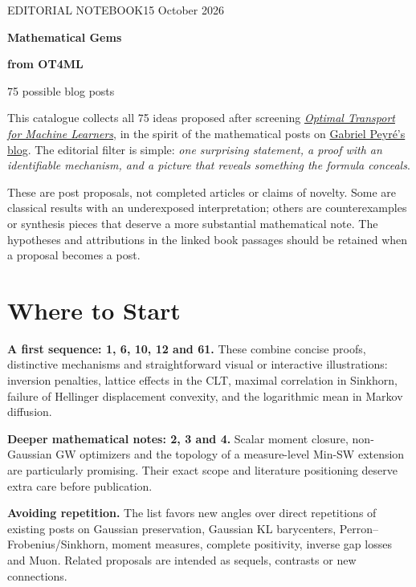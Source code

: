 \documentclass[11pt,a4paper]{article}
\newcounter{post}
\begin{document}
\thispagestyle{empty}
{\small\sffamily\color{accent}EDITORIAL NOTEBOOK\hfill 15 October 2026\par}
\vspace{13pt}
{\Huge\bfseries\color{ink}Mathematical Gems\par}
\vspace{3pt}
{\Huge\bfseries\color{ink}from OT4ML\par}
\vspace{9pt}
{\Large\color{muted}75 possible blog posts\par}
\vspace{15pt}

This catalogue collects all 75 ideas proposed after screening
\href{https://www.gpeyre.com/ot4ml/}{\emph{Optimal Transport for Machine Learners}},
in the spirit of the mathematical posts on
\href{https://www.gpeyre.com/blog/}{Gabriel Peyr\'e's blog}.
The editorial filter is simple: \emph{one surprising statement, a proof with an
identifiable mechanism, and a picture that reveals something the formula conceals}.

These are post proposals, not completed articles or claims of novelty.
Some are classical results with an underexposed interpretation; others are
counterexamples or synthesis pieces that deserve a more substantial mathematical
note. The hypotheses and attributions in the linked book passages should be
retained when a proposal becomes a post.

\section*{Where to Start}
\textbf{A first sequence: 1, 6, 10, 12 and 61.}
These combine concise proofs, distinctive mechanisms and straightforward visual
or interactive illustrations: inversion penalties, lattice effects in the CLT,
maximal correlation in Sinkhorn, failure of Hellinger displacement convexity, and
the logarithmic mean in Markov diffusion.

\textbf{Deeper mathematical notes: 2, 3 and 4.}
Scalar moment closure, non-Gaussian GW optimizers and the topology of a
measure-level Min-SW extension are particularly promising. Their exact scope and
literature positioning deserve extra care before publication.

\textbf{Avoiding repetition.}
The list favors new angles over direct repetitions of existing posts on Gaussian
preservation, Gaussian KL barycenters, Perron--Frobenius/Sinkhorn, moment measures,
complete positivity, inverse gap losses and Muon. Related proposals are intended
as sequels, contrasts or new connections.
\end{document}
